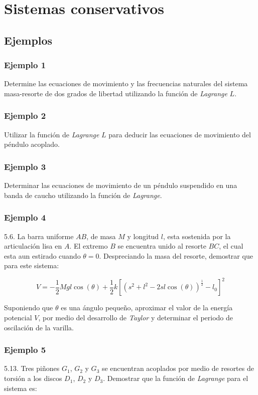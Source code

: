 \chapter{Sistemas conservativos}

\section{Ejemplos}

\subsection{Ejemplo 1}
Determine las ecuaciones de movimiento y las frecuencias naturales del sistema
masa-resorte de dos grados de libertad utilizando la función de \emph{Lagrange}
$L$.

\subsection{Ejemplo 2}
Utilizar la función de \emph{Lagrange} $L$ para deducir las ecuaciones de
movimiento del péndulo acoplado.

\subsection{Ejemplo 3}
Determinar las ecuaciones de movimiento de un péndulo suspendido en una banda de
caucho utilizando la función de \emph{Lagrange}.

\subsection{Ejemplo 4}
5.6. La barra uniforme $AB$, de masa $M$ y longitud $l$, esta sostenida por la
articulación lisa en $A$. El extremo $B$ se encuentra unido al resorte $BC$, el
cual esta aun estirado cuando $\theta=0$. Despreciando la masa del resorte,
demostrar que para este sistema:

\begin{equation*}
    V=-\frac{1}{2}Mgl\cos(\theta)+
      \frac{1}{2}k{[{(s^2+l^2-2sl\cos(\theta))}^{\frac{1}{2}}-l_0]}^2
\end{equation*}

Suponiendo que $\theta$ es una ángulo pequeño, aproximar el valor de la energía
potencial $V$, por medio del desarrollo de \emph{Taylor} y determinar el periodo
de oscilación de la varilla.

\subsection{Ejemplo 5}
5.13. Tres piñones $G_1$, $G_2$ y $G_3$ se encuentran acoplados por medio de
resortes de torsión a los discos $D_1$, $D_2$ y $D_3$. Demostrar que la función
de \emph{Lagrange} para el sistema es:

